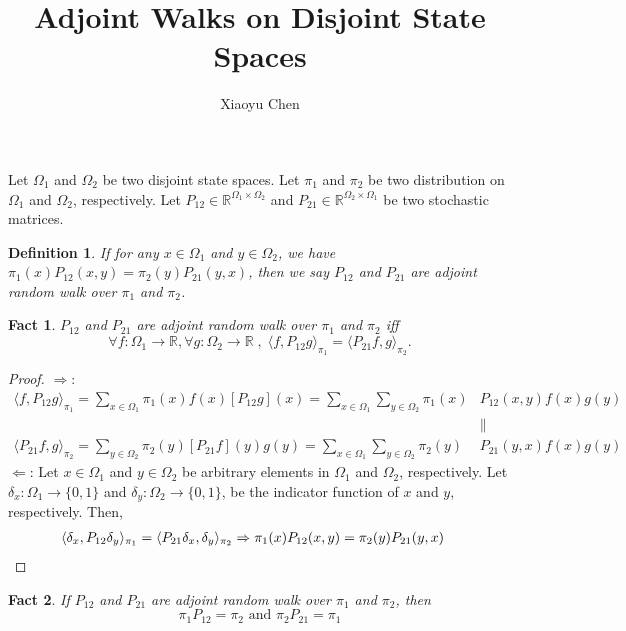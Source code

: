 \documentclass{article}
\title{Adjoint Walks on Disjoint State Spaces}
\author{Xiaoyu Chen}
\date{}
\newtheorem{define}{Definition}
\newtheorem{fact}{Fact}
\def\<{\langle}
\def\>{\rangle}
\begin{document}
\maketitle

Let $\Omega_1$ and $\Omega_2$ be two disjoint state spaces.
Let $\pi_1$ and $\pi_2$ be two distribution on $\Omega_1$ and $\Omega_2$, respectively.
Let $P_{12} \in \mathbb{R}^{\Omega_1 \times \Omega_2}$ and $P_{21} \in \mathbb{R}^{\Omega_2 \times \Omega_1}$ be two stochastic matrices.

\begin{define}
  If for any $x\in \Omega_1$ and $y \in \Omega_2$, we have $\pi_1(x)P_{12}(x, y) = \pi_2(y)P_{21}(y, x)$, then we say $P_{12}$ and $P_{21}$ are \emph{adjoint random walk} over $\pi_1$ and $\pi_2$.
\end{define}

\begin{fact}
  $P_{12}$ and $P_{21}$ are \emph{adjoint random walk} over $\pi_1$ and $\pi_2$ iff
  \[ \forall f: \Omega_1 \to \mathbb{R}, \forall g: \Omega_2 \to \mathbb{R} \;,\; \<f, P_{12}g\>_{\pi_1} = \< P_{21}f, g \>_{\pi_2}.  \]
\end{fact}
\begin{proof}
  $\Rightarrow$:
  \begin{align*}
    \< f, P_{12} g\>_{\pi_1}
    = \sum_{x\in\Omega_1} \pi_1(x) f(x) \left[P_{12}g\right](x)
    = \sum_{x\in\Omega_1}\sum_{y\in\Omega_2} \pi_1(x)&P_{12}(x, y) f(x) g(y) \\
    &\|\\
    \< P_{21}f, g \>_{\pi_2}
    = \sum_{y\in\Omega_2} \pi_2(y) \left[P_{21}f\right](y) g(y)
    = \sum_{x\in\Omega_1}\sum_{y\in\Omega_2} \pi_2(y)&P_{21}(y, x) f(x) g(y)
  \end{align*}
  $\Leftarrow$: Let $x \in \Omega_1$ and $y \in \Omega_2$ be arbitrary elements in $\Omega_1$ and $\Omega_2$, respectively.
  Let $\delta_x : \Omega_1 \to \{0, 1\}$ and $\delta_y : \Omega_2 \to \{0, 1\}$, be the indicator function of $x$ and $y$, respectively.
  Then,
  \begin{align*}
    \<\delta_x, P_{12}\delta_y\>_{\pi_1} &= \<P_{21}\delta_x, \delta_y\>_{\pi_2} \Rightarrow \pi_1(x)P_{12}(x, y) = \pi_2(y)P_{21}(y, x) \qedhere
  \end{align*}
\end{proof}

\begin{fact}
  If $P_{12}$ and $P_{21}$ are \emph{adjoint random walk} over $\pi_1$ and $\pi_2$, then
  \[\pi_1P_{12} = \pi_2 \mbox{ and } \pi_2P_{21} = \pi_1\]
\end{fact}
\end{document}
